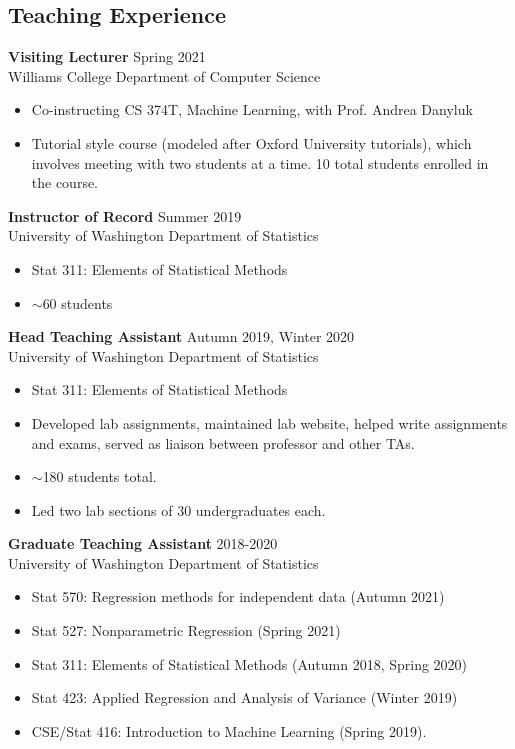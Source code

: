 \documentclass[margin, 10pt]{res} %
\begin{document}
\begin{resume}
{\section{Teaching Experience}
{\textbf{Visiting Lecturer}} \hfill Spring 2021 \\
Williams College Department of Computer Science
\begin{itemize}
\item Co-instructing CS 374T, Machine Learning, with Prof. Andrea Danyluk
\item Tutorial style course (modeled after Oxford University tutorials), which involves meeting with two students at a time. 10 total students enrolled in the course. 
\end{itemize}
{\textbf{Instructor of Record}} \hfill Summer 2019 \\
University of Washington Department of Statistics
\begin{itemize}
\item Stat 311: Elements of Statistical Methods
\item $\sim$60 students
\end{itemize}
{\textbf{Head Teaching Assistant}} \hfill Autumn 2019, Winter 2020 \\
University of Washington Department of Statistics
\begin{itemize}
\item Stat 311: Elements of Statistical Methods
\item Developed lab assignments, maintained lab website, helped write assignments and exams, served as liaison between professor and other TAs.  
\item $\sim$180 students total. 
\item Led two lab sections of 30 undergraduates each. 
\end{itemize} 
{\textbf{Graduate Teaching Assistant}} \hfill 2018-2020\\
University of Washington Department of Statistics
\begin{itemize}
\item Stat 570: Regression methods for independent data (Autumn 2021)
\item Stat 527: Nonparametric Regression (Spring 2021)
\item Stat 311: Elements of Statistical Methods (Autumn 2018, Spring 2020)
\item Stat 423:  Applied Regression and Analysis of Variance (Winter 2019)
\item CSE/Stat 416: Introduction to Machine Learning (Spring 2019). 

\end{itemize}}
\end{resume}
\end{document}
